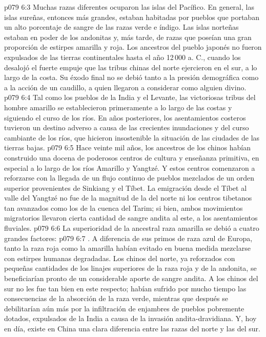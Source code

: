 \vs p079 6:3 Muchas razas diferentes ocuparon las islas del Pacífico. En general, las islas sureñas, entonces más grandes, estaban habitadas por pueblos que portaban un alto porcentaje de sangre de las razas verde e índigo. Las islas norteñas estaban en poder de los andonitas y, más tarde, de razas que poseían una gran proporción de estirpes amarilla y roja. Los ancestros del pueblo japonés no fueron expulsados de las tierras continentales hasta el año 12\,000 a. C., cuando los desalojó el fuerte empuje que las tribus chinas del norte ejercieron en el sur, a lo largo de la costa. Su éxodo final no se debió tanto a la presión demográfica como a la acción de un caudillo, a quien llegaron a considerar como alguien divino.
\vs p079 6:4 Tal como los pueblos de la India y el Levante, las victoriosas tribus del hombre amarillo se establecieron primeramente a lo largo de las costas y siguiendo el curso de los ríos. En años posteriores, los asentamientos costeros tuvieron un destino adverso a causa de las crecientes inundaciones y del curso cambiante de los ríos, que hicieron insostenible la situación de las ciudades de las tierras bajas.
\vs p079 6:5 Hace veinte mil años, los ancestros de los chinos habían construido una docena de poderosos centros de cultura y enseñanza primitiva, en especial a lo largo de los ríos Amarillo y Yangtzé. Y estos centros comenzaron a reforzarse con la llegada de un flujo continuo de pueblos mezclados de un orden superior provenientes de Sinkiang y el Tíbet. La emigración desde el Tíbet al valle del Yangtzé no fue de la magnitud de la del norte ni los centros tibetanos tan avanzados como los de la cuenca del Tarim; si bien, ambos movimientos migratorios llevaron cierta cantidad de sangre andita al este, a los asentamientos fluviales.
\vs p079 6:6 La superioridad de la ancestral raza amarilla se debió a cuatro grandes factores:
\vs p079 6:7 . A diferencia de sus primos de raza azul de Europa, tanto la raza roja como la amarilla habían evitado en buena medida mezclarse con estirpes humanas degradadas. Los chinos del norte, ya reforzados con pequeñas cantidades de los linajes superiores de la raza roja y de la andonita, se beneficiarían pronto de un considerable aporte de sangre andita. A los chinos del sur no les fue tan bien en este respecto; habían sufrido por mucho tiempo las consecuencias de la absorción de la raza verde, mientras que después se debilitarían aún más por la infiltración de enjambres de pueblos pobremente dotados, expulsados de la India a causa de la invasión andita\hyp{}dravidiana. Y, hoy en día, existe en China una clara diferencia entre las razas del norte y las del sur.
